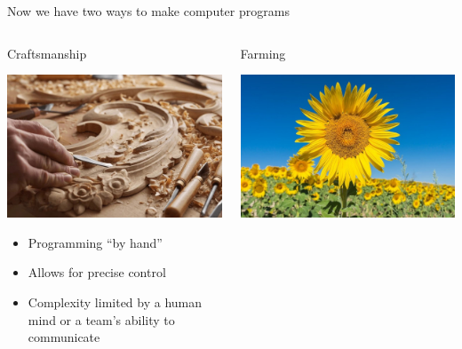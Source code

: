 \documentclass[aspectratio=169]{beamer}
\begin{document}
\begin{frame}{Now we have two ways to make computer programs}
\vspace{-0.5 cm}

\begin{columns}[t]
\begin{center}
\Large Craftsmanship

\vspace{0.25 cm}
\includegraphics[width=0.8\linewidth]{../../img/craftsmanship.jpg}

\normalsize
\vspace{0.25 cm}
\begin{itemize}
\item Programming ``by hand''
\item Allows for precise control
\item Complexity limited by a human mind or a team's ability to communicate
\end{itemize}
\end{center}

\begin{center}
\Large Farming

\vspace{0.25 cm}
\includegraphics[width=0.8\linewidth]{../../img/farming.jpg}


\end{center}
\end{columns}
\end{frame}
\end{document}
